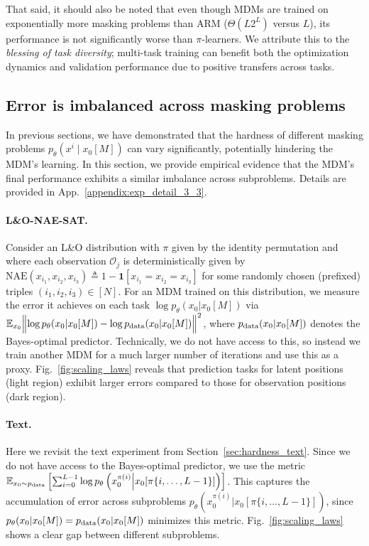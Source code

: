 \documentclass{article}
\theoremstyle{plain}
\theoremstyle{definition}
\theoremstyle{remark}
\begin{document}
That said, it should also be noted that even though MDMs are trained on exponentially more masking problems than ARM ($\Theta(L2^L)$ versus $L$), its performance is not significantly worse than $\pi$-learners. We attribute this to the \emph{blessing of task diversity};  multi-task training can benefit both the optimization dynamics \cite{kim2024task} and validation performance \cite{tripuraneni2022provablem,andreas2016benefit,ruder2017overview} due to positive transfers across tasks.


\subsection{Error is imbalanced across masking problems}
\label{sec:imbalance_error}
In previous sections, we have demonstrated that the hardness of different masking problems \( p_\theta(x^i \mid x_0[M]) \) can vary significantly, potentially hindering the MDM's learning. In this section, we provide empirical evidence that the MDM's final performance exhibits a similar imbalance across subproblems. Details are provided in App.~\ref{appendix:exp_detail_3_3}.

\paragraph{L\&O-NAE-SAT.}
Consider an L\&O distribution with $\pi$ given by the identity permutation and where each observation $\mathcal{O}_j$ is deterministically given by $\mathrm{NAE}(x_{i_1},x_{i_2},x_{i_3}) \triangleq 1 - \mathbf{1}[x_{i_1} = x_{i_2} = x_{i_3}]$ for some randomly chosen (prefixed) triples $(i_1,i_2,i_3) \in[N]$. For an MDM trained on this distribution, we measure the error it achieves on each task $\log p_\theta(x_0 | x_0[M])$ via $ \mathbb{E}_{x_0} \Bigl \| \log p_\theta(x_0 | x_0[M])-  \log p_{\rm data}(x_0 | x_0[M]) \Bigr\|^2$,
where $p_{\rm data}(x_0 | x_0[M])$ denotes the Bayes-optimal predictor.
Technically, we do not have access to this, so instead we train another MDM for a much larger number of iterations and use this as a proxy. Fig.~\ref{fig:scaling_laws} reveals that prediction tasks for latent positions (light region) exhibit larger errors compared to those for observation positions (dark region). 
 
\paragraph{Text.}
Here we revisit the text experiment from Section~\ref{sec:hardness_text}. Since we do not have access to the Bayes-optimal predictor, we use the metric
{\small
$
    \mathbb{E}_{x_0 \sim p_{\rm{data}}}\left[\sum_{i=0}^{L-1} \log p_\theta \left( x_0^{\pi(i)} \Big| x_0 [\pi\{i,\ldots,L-1\}] \right) \right]
$}. This captures the accumulation of error across subproblems $p_\theta \left( x_0^{\pi(i)} \Big| x_0 [\pi\{i,\ldots,L-1\}] \right)$, since $p_\theta(x_0 | x_0[M]) = p_{\rm{data}}(x_0 | x_0[M])$ minimizes this metric. Fig.~\ref{fig:scaling_laws} shows a clear gap between different subproblems.
\end{document}
